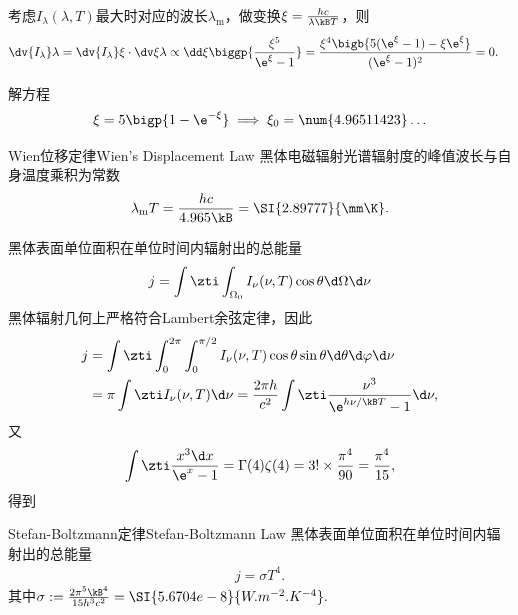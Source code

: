 考虑$I_\lambda(\lambda,T)$最大时对应的波长$\lambda_{\mathrm m}$，做变换$\xi=\frac{hc}{\lambda\kB T}$，则
\begin{align*}
	\dv{I_\lambda}\lambda & =\dv{I_\lambda}\xi\cdot\dv\xi\lambda\propto\dd\xi\biggp{\frac{\xi^5}{\e^{\xi}-1}}
	=\frac{\xi^4\bigb{5(\e^\xi-1)-\xi\e^\xi}}{(\e^\xi-1)^2}=0.
\end{align*}

解方程
\[
	\xi=5\bigp{1-\e^{-\xi}}\implies\xi_0=\num{4.96511423}\ldots
\]
\begin{theorem}{Wien位移定律}{Wien's Displacement Law}
	黑体电磁辐射光谱辐射度的峰值波长与自身温度乘积为常数
	\begin{align}
		\lambda_\mathrm m T=\frac{hc}{4.965\kB}=\SI{2.89777}{\mm\K}.
	\end{align}
\end{theorem}

黑体表面单位面积在单位时间内辐射出的总能量
\[
	j=\int\zti\int_{\Omega_0}I_\nu(\nu,T)\cos\theta\d\Omega\d\nu
\]
黑体辐射几何上严格符合Lambert余弦定律，因此
\begin{align*}
	j & =\int\zti\int_0^{2\pi}\int_0^{\pi/2}I_\nu(\nu,T)\cos\theta\sin\theta\d\theta\d\varphi\d\nu \\
	  & =\pi\int\zti I_\nu(\nu,T)\d\nu=\frac{2\pi h}{c^2}\int\zti\frac{\nu^3}{\e^{h\nu/\kB T}-1}\d\nu,
\end{align*}
又
\[
	\int\zti\frac{x^3\d x}{\e^x-1}=\Gamma(4)\zeta(4)=3!\times\frac{\pi^4}{90}=\frac{\pi^4}{15},
\]
得到
\begin{theorem}{Stefan-Boltzmann定律}{Stefan-Boltzmann Law}
	黑体表面单位面积在单位时间内辐射出的总能量
	\begin{align}
		j=\sigma T^4.
	\end{align}
	其中$\sigma:=\frac{2\pi^5\kB^4}{15h^3c^2}=\SI{5.6704e-8}{W.m^{-2}.K^{-4}}.$
\end{theorem}
